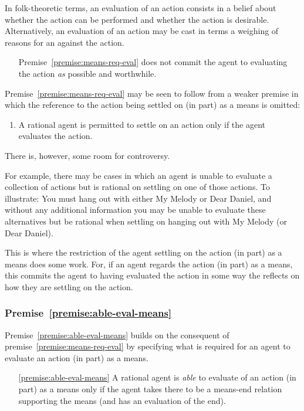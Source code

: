 \documentclass[10pt]{article}
\newcommand{\hand}{\ding{43}}
\begin{document}
In folk-theoretic terms, an evaluation of an action consists in a belief about whether the action can be performed and whether the action is desirable.
Alternatively, an evaluation of an action may be cast in terms a weighing of reasons for an against the action.

\begin{itemize}
\item[\hand] Premise~\ref{premise:means-req-eval} does not commit the agent to evaluating the action \emph{as} possible and worthwhile.
\end{itemize}

Premise~\ref{premise:means-req-eval} may be seen to follow from a weaker premise in which the reference to the action being settled on (in part) as a means is omitted:
\begin{enumerate}
\item\label{premise:means-req-eval-weak} A rational agent is permitted to settle on an action only if the agent evaluates the action.
\end{enumerate}


There is, however, some room for controversy.

For example, there may be cases in which an agent is unable to evaluate a collection of actions but is rational on settling on one of those actions.
To illustrate: You must hang out with either My Melody or Dear Daniel, and without any additional information you may be unable to evaluate these alternatives but be rational when settling on hanging out with My Melody (or Dear Daniel).

This is where the restriction of the agent settling on the action (in part) as a means does some work.
For, if an agent regards the action (in part) as a means, this commits the agent to having evaluated the action in some way the reflects on how they are settling on the action.

\newpage

\subsubsection{Premise~\ref{premise:able-eval-means}}

Premise~\ref{premise:able-eval-means} builds on the consequent of premise~\ref{premise:means-req-eval} by specifying what is required for an agent to evaluate an action (in part) as a means.

\begin{enumerate}
\item[\ref{premise:able-eval-means}] A rational agent is \emph{able} to evaluate of an action (in part) as a means only if the agent takes there to be a means-end relation supporting the means (and has an evaluation of the end).
\end{enumerate}
\end{document}
